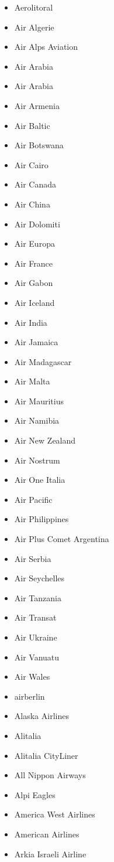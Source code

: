 \begin{itemize}
\begin{itemize}
	\item Aerolitoral
	\item Air Algerie
	\item Air Alps Aviation
	\item Air Arabia
	\item Air Arabia
	\item Air Armenia
	\item Air Baltic
	\item Air Botswana
	\item Air Cairo
	\item Air Canada
	\item Air China
	\item Air Dolomiti
	\item Air Europa
	\item Air France
	\item Air Gabon
	\item Air Iceland
	\item Air India
	\item Air Jamaica
	\item Air Madagascar
	\item Air Malta
	\item Air Mauritius
	\item Air Namibia
	\item Air New Zealand
	\item Air Nostrum
	\item Air One Italia
	\item Air Pacific
	\item Air Philippines
	\item Air Plus Comet Argentina
	\item Air Serbia
	\item Air Seychelles
	\item Air Tanzania
	\item Air Transat
	\item Air Ukraine
	\item Air Vanuatu
	\item Air Wales
	\item airberlin
	\item Alaska Airlines
	\item Alitalia
	\item Alitalia CityLiner
	\item All Nippon Airways
	\item Alpi Eagles
	\item America West Airlines
	\item American Airlines
	\item Arkia Israeli Airline

\end{itemize}
\end{itemize}

